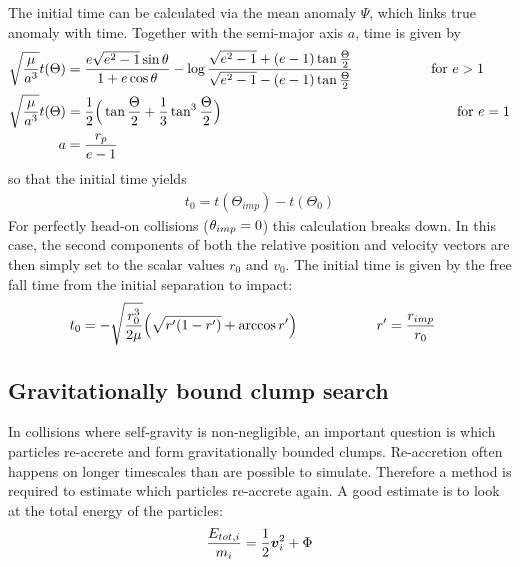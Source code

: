 The initial time can be calculated via the mean anomaly $\Psi$, which links true anomaly with time. Together with the semi-major axis $a$, time is given by
\begin{align}
\label{ch02_aux_eq011}
\sqrt{\frac{\mu}{a^3} } t(\Theta) &=  \frac{e \sqrt{e^2-1} \sin{\theta} }{1 + e \cos{\theta}} - \log{\frac{\sqrt{e^2-1} + (e - 1) \tan{\frac{\Theta}{2}} }{  \sqrt{e^2-1} - (e - 1) \tan{\frac{\Theta}{2}} } } \hspace{2.0cm} \text{for~} e > 1\\
\sqrt{\frac{\mu}{a^3} } t(\Theta) &=  \frac{1}{2} \Big( \tan{\frac{\Theta}{2}} + \frac{1}{3} \tan^3{\frac{\Theta}{2}}\Big) \hspace{6.0cm} \text{for~} e = 1\\
a &= \frac{r_p}{e - 1} 
\end{align}
so that the initial time yields
\begin{align}
\label{ch02_aux_eq012}
t_0 = t(\Theta_{imp}) -  t(\Theta_0)
\end{align}
For perfectly head-on collisions ($\theta_{imp} = 0$) this calculation breaks down. In this case, the second components of both the relative position and velocity vectors are then simply set to the scalar values $r_0$ and $v_0$. The initial time is given by the free fall time from the initial separation to impact:
\begin{align}
\label{ch02_aux_eq013}
t_0 &= -\sqrt{\frac{r_0^3}{2 \mu}} \Big( \sqrt{r' (1-r')} + \arccos{r'} \Big) \hspace{2.0cm} r' = \frac{r_{imp}}{r_0}
\end{align}

\subsection{Gravitationally bound clump search}
\label{ch02_sec04_ss05}
In collisions where self-gravity is non-negligible, an important question is which particles re-accrete and form gravitationally bounded clumps. Re-accretion often happens on longer timescales than are possible to simulate. Therefore a method is required to estimate which particles re-accrete again. A good estimate is to look at the total energy of the particles:
\begin{align}
\label{ch02_aux_eq014}
\frac{E_{tot,i}}{m_i} = \frac{1}{2} \boldsymbol{v}_i^2 + \Phi
\end{align}


